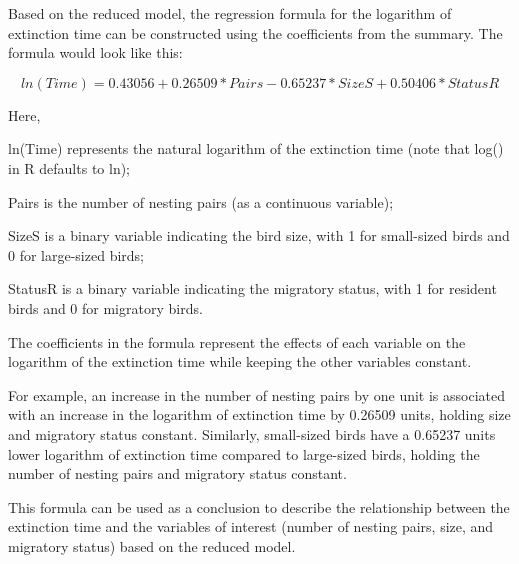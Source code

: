 \documentclass{article}
\begin{document}
Based on the reduced model, the regression formula for the
logarithm of extinction time can be constructed using the coefficients
from the summary. The formula would look like this:

$$ln(Time) = 0.43056 + 0.26509 * Pairs - 0.65237 * SizeS + 0.50406 *
StatusR$$

Here,

ln(Time) represents the natural logarithm of the extinction time (note
that log() in R defaults to ln);

Pairs is the number of nesting pairs (as a continuous variable);

SizeS is a binary variable indicating the bird size, with 1 for
small-sized birds and 0 for large-sized birds;

StatusR is a binary variable indicating the migratory status, with 1 for
resident birds and 0 for migratory birds.

The coefficients in the formula represent the effects of each variable
on the logarithm of the extinction time while keeping the other
variables constant.

For example, an increase in the number of nesting pairs by one unit is
associated with an increase in the logarithm of extinction time by
0.26509 units, holding size and migratory status constant. Similarly,
small-sized birds have a 0.65237 units lower logarithm of extinction
time compared to large-sized birds, holding the number of nesting pairs
and migratory status constant.

This formula can be used as a conclusion to describe the relationship
between the extinction time and the variables of interest (number of
nesting pairs, size, and migratory status) based on the reduced model.
\end{document}
